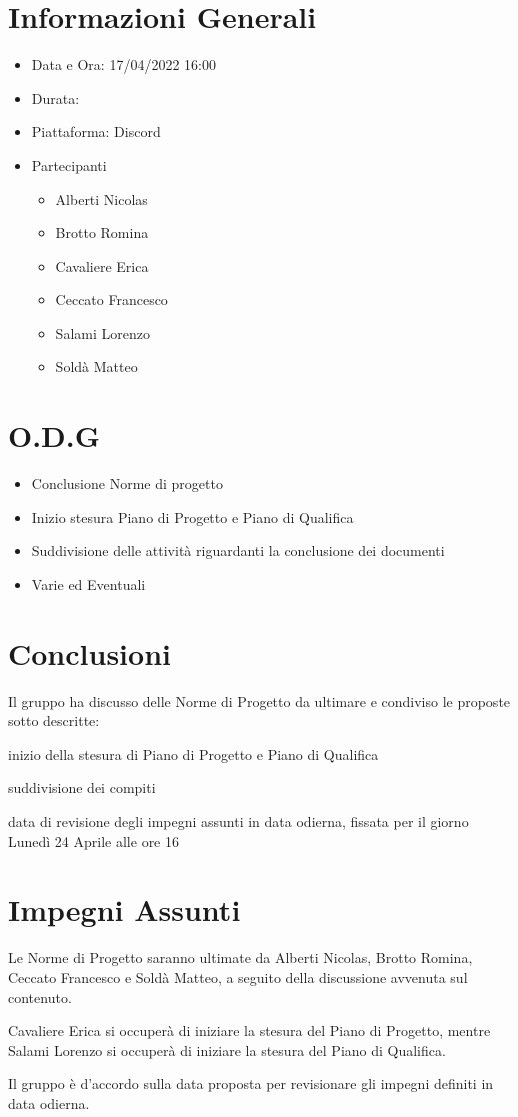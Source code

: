 \documentclass[a4paper, 12pt]{article}
\begin{document}
\makefrontpage

\section*{Informazioni Generali}
\begin{itemize}
    \item Data e Ora: 17/04/2022 16:00
    \item Durata: 
    \item Piattaforma: Discord
    \item Partecipanti
    \begin{itemize}
        \item Alberti Nicolas
        \item Brotto Romina
        \item Cavaliere Erica
        \item Ceccato Francesco
        \item Salami Lorenzo
        \item Soldà Matteo
    \end{itemize}
\end{itemize}

\section*{O.D.G}
\begin{itemize}
    \item Conclusione Norme di progetto
    \item Inizio stesura Piano di Progetto e Piano di Qualifica
    \item Suddivisione delle attività riguardanti la conclusione dei documenti
    \item Varie ed Eventuali
\end{itemize}

\section*{Conclusioni}
Il gruppo ha discusso delle Norme di Progetto da ultimare e condiviso le proposte sotto descritte:
\item inizio della stesura di Piano di Progetto e Piano di Qualifica
\item suddivisione dei compiti
\item data di revisione degli impegni assunti in data odierna, fissata per il giorno Lunedì 24 Aprile alle ore 16
\section*{Impegni Assunti}
\item Le Norme di Progetto saranno ultimate da Alberti Nicolas, Brotto Romina, Ceccato Francesco e Soldà Matteo, a seguito della discussione avvenuta sul contenuto.
\item Cavaliere Erica si occuperà di iniziare la stesura del Piano di Progetto, mentre Salami Lorenzo si occuperà di iniziare la stesura del Piano di Qualifica.
\item Il gruppo è d'accordo sulla data proposta per revisionare gli impegni definiti in data odierna.
\end{document}
